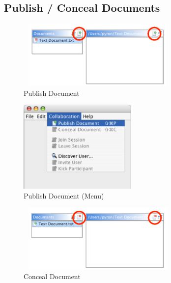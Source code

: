 \documentclass[11pt,a4paper]{article}
\begin{document}
\subsection{Publish / Conceal Documents}
\label{publish_conceal_documents}
\begin{figure}[H]
\begin{center}
  \includegraphics[height=1.32in, width=3.16in]{../images/usermanual/g_editor_view_publish.eps}
\caption{Publish Document}
\label{default}
\end{center}
\end{figure}

\begin{figure}[H]
\begin{center}
  \includegraphics[height=1.78in, width=2.28in]{../images/usermanual/menu_collab_publish.eps}
\caption{Publish Document (Menu)}
\label{default}
\end{center}
\end{figure}

\begin{figure}[H]
\begin{center}
  \includegraphics[height=1.32in, width=3.16in]{../images/usermanual/g_editor_view_conceal.eps}
\caption{Conceal Document}
\label{default}
\end{center}
\end{figure}
\end{document}
